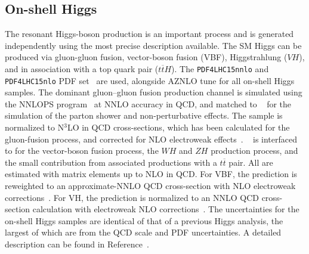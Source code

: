 \subsection{On-shell Higgs}
The resonant Higgs-boson production is an important process and is generated independently using the most precise description available. The SM Higgs can be produced via gluon-gluon fusion, vector-boson fusion (VBF), Higgstrahlung ($VH$), and in association with a top quark pair ($t\overline{t}H$). The \texttt{PDF4LHC15nnlo} and \texttt{PDF4LHC15nlo} PDF set~\cite{Butterworth:2015oua} are used, alongside AZNLO tune for all on-shell Higgs samples. The dominant gluon–gluon fusion production channel is simulated using the \powheg{} NNLOPS program~\cite{Hamilton:2013fea, Hamilton:2015nsa,Alioli:2010xd,Nason:2004rx,Frixione:2007vw} at NNLO accuracy in QCD, and matched to \pythia~\cite{Sjostrand:2014zea} for the simulation of the parton shower and non-perturbative effects. The sample is normalized to N$^3$LO in QCD cross-sections, which has been calculated for the gluon-fusion process, and corrected for NLO electroweak effects~\cite{deFlorian:2016spz,Anastasiou:2016cez,Anastasiou:2015ema,Dulat:2018rbf,Harlander:2009mq,Harlander:2009bw,Harlander:2009my,Pak:2009dg,Actis:2008ug,Actis:2008ts,Bonetti:2018ukf}. 
\powheg~\cite{Nason:2009ai,Alioli:2010xd,Nason:2004rx,Frixione:2007vw} is interfaced to \pythia{} for the vector-boson fusion process, the $WH$ and $ZH$ production process, and the small contribution from associated productions with a $t\overline{t}$ pair. All are estimated with matrix elements up to NLO in QCD. For VBF, the prediction is reweighted to an approximate-NNLO QCD cross-section with NLO electroweak corrections~\cite{Ciccolini:2007jr,Ciccolini:2007ec,Bolzoni:2010xr}. For VH, the prediction is normalized to an NNLO QCD cross-section calculation with electroweak NLO corrections~\cite{Ciccolini:2003jy,Brein:2003wg,Brein:2011vx,Denner:2014cla,Brein:2012ne}. 
The uncertainties for the on-shell Higgs samples are identical of that of a previous Higgs analysis, the largest of which are from the QCD scale and PDF uncertainties. A detailed description can be found in Reference~\cite{HIGG-2016-22}. 

